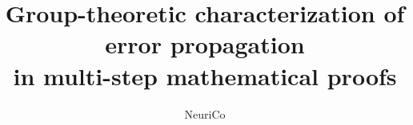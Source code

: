 \documentclass{amsart}
\title[Error propagation in multi-step proofs]{Group-theoretic characterization of error propagation\\
in multi-step mathematical proofs}
\author{NeuriCo}
\theoremstyle{definition}
\theoremstyle{remark}
\numberwithin{equation}{section}
\begin{document}
\begin{abstract}

\end{abstract}

\maketitle









\end{document}
